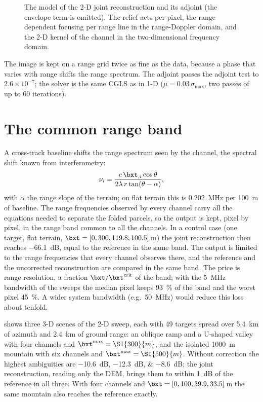 \begin{figure}[htbp]
\centering

\caption[The model of the 2-D joint reconstruction]{The model of the 2-D joint reconstruction and its adjoint (the envelope
term is omitted). The relief acts per pixel, the range-dependent focusing per range line in the range-Doppler domain, and the
2-D kernel of the channel in the two-dimensional frequency domain.}
\label{fig:chain2d}
\end{figure}

The image is kept on a range grid twice as fine as the data, because a phase that varies with range shifts the range spectrum.
The adjoint passes the adjoint test to $2.6\times10^{-7}$; the solver is the same CGLS as in 1-D ($\mu=0.03\,\sigma_{\max}$,
two passes of up to 60 iterations).

\section{The common range band}

A cross-track baseline shifts the range spectrum seen by the channel, the spectral shift known from interferometry:
\begin{equation}
  \nu_i = \frac{c\,\bxt_{,i}\cos\theta}{2\lambda\, r\tan(\theta-\alpha)},
\end{equation}
with $\alpha$ the range slope of the terrain; on flat terrain this is \SI{0.202}{MHz} per \SI{100}{m} of baseline. The range
frequencies observed by every channel carry all the equations needed to separate the folded parcels, so the output is kept,
pixel by pixel, in the range band common to all the channels. In a control case (one target, flat terrain,
$\bxt=[0,300,119.8,100.5]$\,\si{m}) the joint reconstruction then reaches \SI{-66.1}{dB}, equal to the reference in the same
band. The output is limited to the range frequencies that every channel observes there, and the reference and the uncorrected reconstruction are compared in the same band. The price is range
resolution, a fraction $\bxt/\bxt^{\mathrm{crit}}$ of the band; with the \SI{5}{MHz} bandwidth of the sweeps the median pixel
keeps \SI{93}{\percent} of the band and the worst pixel \SI{45}{\percent}. A wider system bandwidth (e.g.\ \SI{50}{MHz})
would reduce this loss about tenfold.

 shows three 3-D scenes of the 2-D sweep, each with 49 targets spread over \SI{5.4}{km} of azimuth and
\SI{2.4}{km} of ground range: an oblique ramp and a U-shaped valley with four channels and $\bxt^{\max}=\SI{300}{m}$, and the
isolated \SI{1000}{m} mountain with six channels and $\bxt^{\max}=\SI{500}{m}$. Without correction the highest ambiguities are
\SIlist{-10.6;-12.3;-8.6}{dB}; the joint reconstruction, reading only the DEM, brings them to within \SI{1}{dB} of the reference in
all three. With four channels and $\bxt=[0,100,39.9,33.5]$\,\si{m} the same mountain also reaches the reference exactly.

